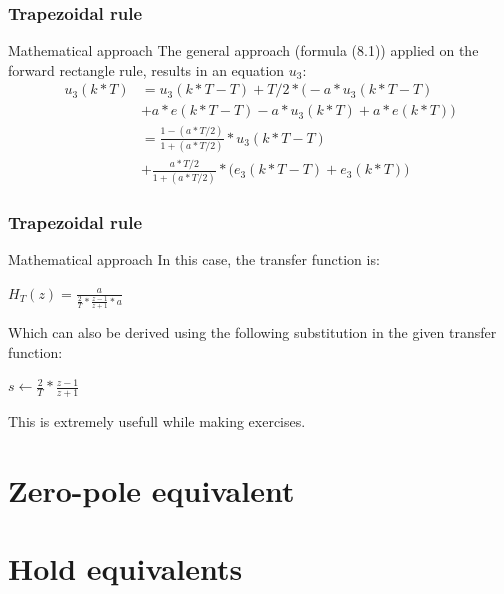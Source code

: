 \begin{frame}
	\frametitle{Trapezoidal rule}
	\begin{block}{Mathematical approach}
		The general approach (formula (8.1)) applied on the forward rectangle rule, results in an equation $u_3$:
		\begin{align*}
		u_3(k*T)& =u_3(k*T - T) + T/2*\big(-a*u_3(k*T - T)\\
		& + a*e(k*T - T) - a*u_3(k*T) + a*e(k*T)\big)\\
		& =\frac{1-(a*T/2)}{1 + (a*T/2)}*u_3(k*T - T)\\
		& +\frac{a*T/2}{1 + (a*T/2)} * \big(e_3(k*T - T) + e_3(k*T)\big)
		\end{align*}
	\end{block}
\end{frame}

\begin{frame}
	\frametitle{Trapezoidal rule}
	\begin{block}{Mathematical approach}
		In this case, the transfer function is:
		\begin{center}
			$H_T(z) = \frac{a}{\frac{2}{T}*\frac{z-1}{z+1} * a }$
		\end{center}
		Which can also be derived using the following substitution in the given transfer function:
		\begin{center}
			$s \gets \frac{2}{T} * \frac{z-1}{z+1}$
		\end{center}
		This is extremely usefull while making exercises.
	\end{block}
\end{frame}

\section{Zero-pole equivalent}

\section{Hold equivalents}
